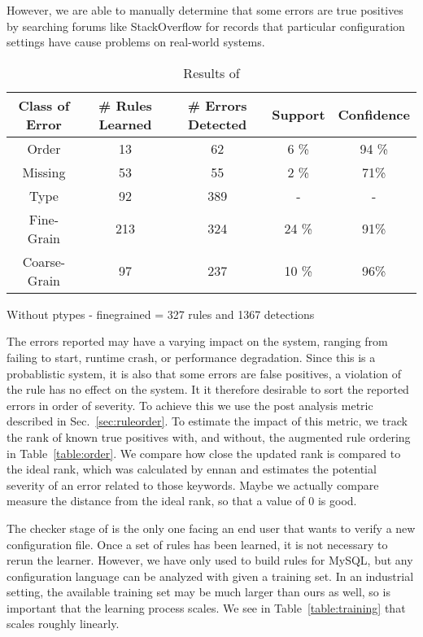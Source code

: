 However, we are able to manually determine that some errors are true
positives by searching forums like StackOverflow for records that
particular configuration settings have cause problems on real-world
systems.


\begin{table}[h]
\centering
\caption{Results of \app}
\label{table:learning}
\setlength{\tabcolsep}{0.5em}
\begin{tabular}{|c|c|c|c|c|}
\hline
{\bf Class of Error } & {\bf \# Rules Learned} & {\bf \# Errors Detected} & {\bf Support} & {\bf Confidence}\\ 
\hline
\hline
Order        & 13  & 62   & 6 \% & 94 \% \\ 
Missing      & 53  & 55   & 2 \%  & 71\% \\ 
Type         & 92  & 389  & -  & -  \\ 
Fine-Grain   & 213 & 324  & 24 \% & 91\%  \\ 
Coarse-Grain & 97  & 237  & 10 \% & 96\% \\ 
\hline 
\end{tabular}
\end{table}

Without ptypes - finegrained = 327 rules and 1367 detections

The errors reported may have a varying impact on the system, ranging from failing to start, runtime crash, or performance degradation.
Since this is a probablistic system, it is also that some errors are false positives, a violation of the rule has no effect on the system.
It it therefore desirable to sort the reported errors in order of severity. 
To achieve this we use the post analysis metric described in Sec.~\ref{sec:ruleorder}.
To estimate the impact of this metric, we track the rank of known true positives with, and without, the augmented rule ordering in Table~\ref{table:order}.
We compare how close the updated rank is compared to the ideal rank, which was calculated by ennan and estimates the potential severity of an error related to those keywords.
Maybe we actually compare measure the distance from the ideal rank, so that a value of 0 is good.



The checker stage of \app is the only one facing an end user that wants to verify a new configuration file.
Once a set of rules has been learned, it is not necessary to rerun the learner.
However, we have only used \app to build rules for MySQL, but any configuration language can be analyzed with \app given a training set.
In an industrial setting, the available training set may be much larger than ours as well, so is important that the learning process scales.
We see in Table~\ref{table:training} that \app scales roughly linearly.

